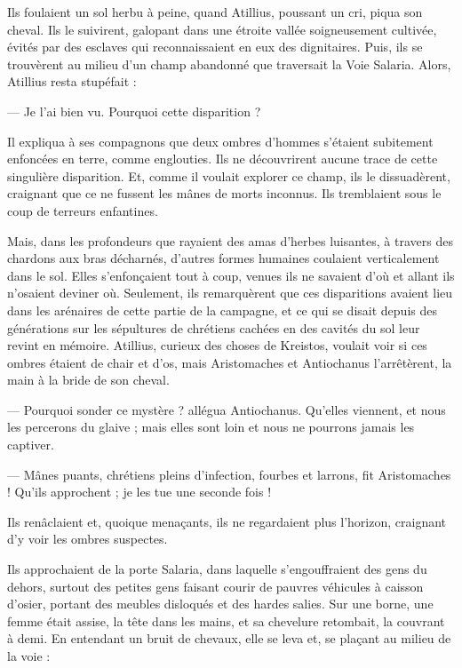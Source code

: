 \documentclass[a4paper, 11pt, oneside, polutonikogreek, french]{article}
\begin{document}
Ils foulaient un sol herbu à peine, quand Atillius, poussant un cri, piqua son cheval. Ils le suivirent, galopant dans une étroite vallée soigneusement cultivée, évités par des esclaves qui reconnaissaient en eux des dignitaires. Puis, ils se trouvèrent au milieu d'un champ abandonné que traversait la Voie Salaria. Alors, Atillius resta stupéfait :

--- Je l'ai bien vu. Pourquoi cette disparition ?

Il expliqua à ses compagnons que deux ombres d'hommes s'étaient subitement enfoncées en terre, comme englouties. Ils ne découvrirent aucune trace de cette singulière disparition. Et, comme il voulait explorer ce champ, ils le dissuadèrent, craignant que ce ne fussent les mânes de morts inconnus. Ils tremblaient sous le coup de terreurs enfantines.

Mais, dans les profondeurs que rayaient des amas d'herbes luisantes, à travers des chardons aux bras décharnés, d'autres formes humaines coulaient verticalement dans le sol. Elles s'enfonçaient tout à coup, venues ils ne savaient d'où et allant ils n'osaient deviner où. Seulement, ils remarquèrent que ces disparitions avaient lieu dans les arénaires de cette partie de la campagne, et ce qui se disait depuis des générations sur les sépultures de chrétiens cachées en des cavités du sol leur revint en mémoire. Atillius, curieux des choses de Kreistos, voulait voir si ces ombres étaient de chair et d'os, mais Aristomaches et Antiochanus l'arrêtèrent, la main à la bride de son cheval.

--- Pourquoi sonder ce mystère ? allégua Antiochanus. Qu'elles viennent, et nous les percerons du glaive ; mais elles sont loin et nous ne pourrons jamais les captiver.

--- Mânes puants, chrétiens pleins d'infection, fourbes et larrons, fit Aristomaches ! Qu'ils approchent ; je les tue une seconde fois !

Ils renâclaient et, quoique menaçants, ils ne regardaient plus l'horizon, craignant d'y voir les ombres suspectes.

Ils approchaient de la porte Salaria, dans laquelle s'engouffraient des gens du dehors, surtout des petites gens faisant courir de pauvres véhicules à caisson d'osier, portant des meubles disloqués et des hardes salies. Sur une borne, une femme était assise, la tête dans les mains, et sa chevelure retombait, la couvrant à demi. En entendant un bruit de chevaux, elle se leva et, se plaçant au milieu de la voie :
\end{document}
